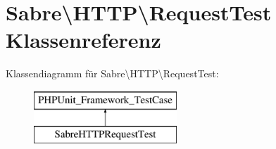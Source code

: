 \hypertarget{class_sabre_1_1_h_t_t_p_1_1_request_test}{}\section{Sabre\textbackslash{}H\+T\+TP\textbackslash{}Request\+Test Klassenreferenz}
\label{class_sabre_1_1_h_t_t_p_1_1_request_test}
Klassendiagramm für Sabre\textbackslash{}H\+T\+TP\textbackslash{}Request\+Test\+:\begin{figure}[H]
\begin{center}
\leavevmode
\includegraphics[height=2.000000cm]{class_sabre_1_1_h_t_t_p_1_1_request_test}
\end{center}
\end{figure}
